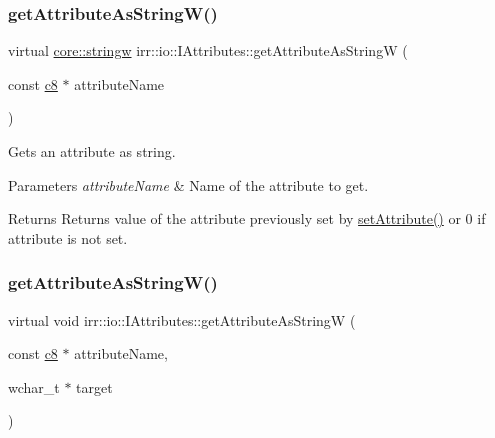 \subsubsection{\texorpdfstring{get\+Attribute\+As\+String\+W()}{getAttributeAsStringW()}\hspace{0.1cm}{\footnotesize\ttfamily [1/3]}}
{\footnotesize\ttfamily virtual \hyperlink{namespaceirr_1_1core_aef83fafbb1b36fcce44c07c9be23a7f2}{core\+::stringw} irr\+::io\+::\+I\+Attributes\+::get\+Attribute\+As\+StringW (\begin{DoxyParamCaption}\item[{const \hyperlink{namespaceirr_a9395eaea339bcb546b319e9c96bf7410}{c8} $\ast$}]{attribute\+Name }\end{DoxyParamCaption})\hspace{0.3cm}{\ttfamily [pure virtual]}}



Gets an attribute as string. 


\begin{DoxyParams}{Parameters}
{\em attribute\+Name} & Name of the attribute to get. \\
\hline
\end{DoxyParams}
\begin{DoxyReturn}{Returns}
Returns value of the attribute previously set by \hyperlink{classirr_1_1io_1_1IAttributes_a03fa31acb481ae23678676cc183f09a6}{set\+Attribute()} or 0 if attribute is not set. 
\end{DoxyReturn}
\mbox{\label{classirr_1_1io_1_1IAttributes_a972aca66779e767e635a1c52b1559382}} 
\subsubsection{\texorpdfstring{get\+Attribute\+As\+String\+W()}{getAttributeAsStringW()}\hspace{0.1cm}{\footnotesize\ttfamily [2/3]}}
{\footnotesize\ttfamily virtual void irr\+::io\+::\+I\+Attributes\+::get\+Attribute\+As\+StringW (\begin{DoxyParamCaption}\item[{const \hyperlink{namespaceirr_a9395eaea339bcb546b319e9c96bf7410}{c8} $\ast$}]{attribute\+Name,  }\item[{wchar\+\_\+t $\ast$}]{target }\end{DoxyParamCaption})\hspace{0.3cm}{\ttfamily [pure virtual]}}



